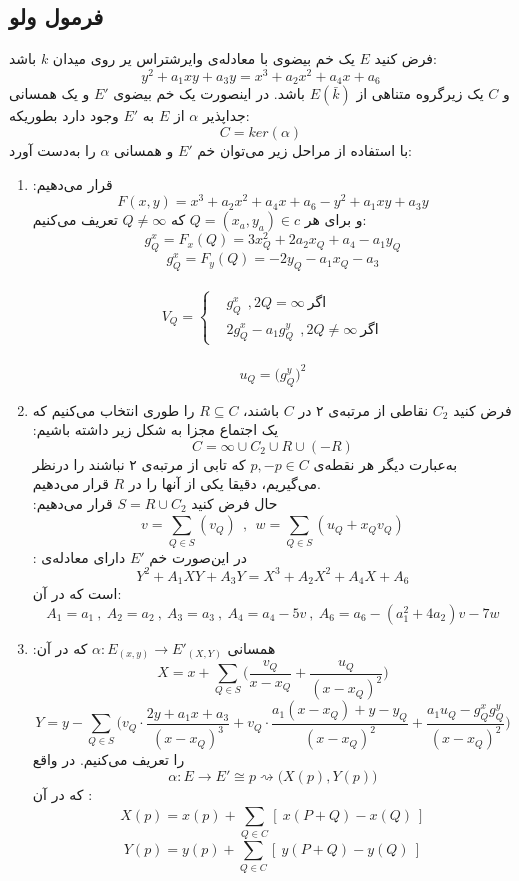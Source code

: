 \subsection{فرمول ولو}
\theorem
فرض کنید 
$E$
یک خم بیضوی با معادله‌ی وایرشتراس یر روی میدان
$k$
باشد:
$$ y^2+a_1xy+a_3y = x^3+a_2x^2+a_4x+a_6 $$
و
$C$
یک زیرگروه متناهی از
$E(\bar{k})$
باشد. در اینصورت یک خم بیضوی
$E'$
و یک همسانی جداپذیر 
$\alpha$
از
$E$
به
$E'$
وجود دارد بطوریکه:
$$C=ker(\alpha)$$
با استفاده از مراحل زیر می‌توان خم
$E'$
و همسانی
$\alpha$
را به‌دست آورد:
\begin{enumerate}
\item{
قرار می‌دهیم:
$$ F(x,y) = x^3+a_2x^2+a_4x+a_6 - y^2+a_1xy+a_3y $$
و برای هر
$Q=(x_a,y_a) \in c$
که
$Q \ne \infty$
تعریف می‌کنیم:
$$ g_Q^x = F_x(Q) = 3x_Q^2+2a_2x_Q+a_4-a_1y_Q$$
$$ g_Q^x = F_y(Q) = -2y_Q-a_1x_Q-a_3 $$
\\
\begin{equation*}
V_Q = 
\begin{cases}
& g_Q^x ~~, 2Q=\infty ~ \text{اگر} \\
& 2g_Q^x - a_1g_Q^y ~~,2Q \ne \infty ~ \text{اگر} 
\end{cases}
\end{equation*}
\\
$$ u_Q = {\Big( g_Q^y \Big)}^2 $$
}
\item{
فرض کنید
$C_2$
نقاطی از مرتبه‌ی ۲ در
$C$
باشند، 
$R \subseteq C$
را طوری انتخاب می‌کنیم که یک اجتماع مجزا به شکل زیر داشته باشیم:
$$ C = {\infty} \cup C_2 \cup R \cup (-R) $$
به‌عبارت دیگر هر نقطه‌ی
$p,-p \in C$
که تابی از مرتبه‌ی ۲ نباشند را درنظر می‌گیریم، دقیقا یکی از آنها را در
$R$
قرار می‌دهیم.
\\
حال فرض کنید
$S=R \cup C_2$
قرار می‌دهیم:
$$ v = \sum\limits^{}_{Q \in S} (v_Q) ~~,~~  w = \sum\limits^{}_{Q \in S}(u_Q+x_Qv_Q) $$
در این‌صورت خم
$E'$
دارای معادله‌ی :
$$Y^2+A_1XY+A_3Y = X^3+A_2X^2+A_4X+A_6$$
است که در آن:
$$ A_1=a_1 ~,~ A_2=a_2 ~,~ A_3=a_3 ~,~ A_4=a_4-5v ~,~ A_6=a_6-(a_1^2+4a_2)v-7w $$
}

\item{
همسانی
$\alpha : E_{(x,y)} \longrightarrow E'_{(X,Y)}$
که در آن:
$$ X = x + \sum\limits^{}_{Q \in S} \big(\frac{v_Q}{x-x_Q} + \frac{u_Q}{(x-x_Q)^2} \big) $$
$$
 Y = y - \sum\limits^{}_{Q \in S} \big( v_Q \cdot \frac{2y+a_1x+a_3}{(x-x_Q)^3} + v_Q \cdot \frac{a_1(x-x_Q)+y-y_Q}{(x-x_Q)^2} + 
\frac{a_1u_Q - g^{x}_{Q} g^y_Q}{(x-x_Q)^2} \big) 
$$
را تعریف می‌کنیم. در واقع
$$ \alpha : E \longrightarrow E' \cong p \rightsquigarrow \big(X(p),Y(p) \big) $$
که در آن :
$$ X(p) = x(p) + \sum\limits^{}_{Q \in C} [~x(P+Q) - x(Q)~] $$
$$ Y(p) = y(p) + \sum\limits^{}_{Q \in C} [~y(P+Q) - y(Q)~] $$
}
\end{enumerate}~
